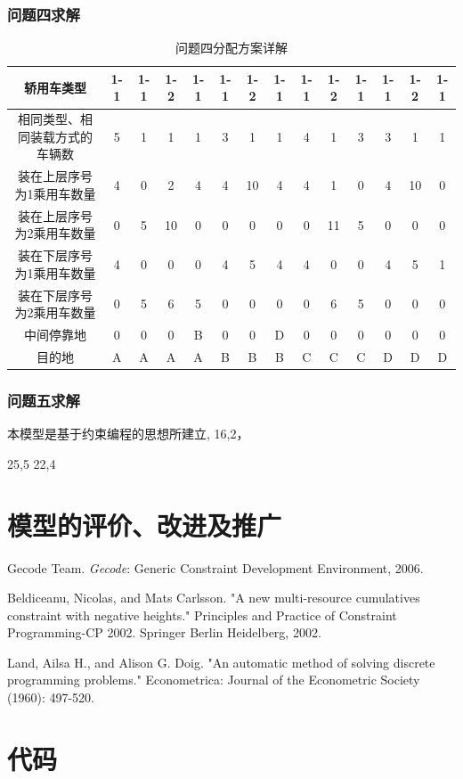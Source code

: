 \documentclass[UTF8]{ctexart}
\begin{document}
\subsubsection{问题四求解}
\begin{table}[h!]
\centering
\caption{问题四分配方案详解}\label{tab:answer4}
\begin{tabular}{|c|c|c|c|c|c|c|c|c|c|c|c|c|c|}
\hline
轿用车类型 & 1-1 & 1-1 & 1-2 & 1-1 & 1-1 & 1-2 & 1-1 & 1-1 & 1-2 & 1-1 & 1-1 & 1-2 & 1-1\\ \hline 
相同类型、相同装载方式的车辆数 & 5 & 1 & 1 & 1 & 3 & 1 & 1 & 4 & 1 & 3 & 3 & 1 & 1\\ \hline 
装在上层序号为1乘用车数量 & 4 & 0 & 2 & 4 & 4 & 10 & 4 & 4 & 1 & 0 & 4 & 10 & 0\\ \hline 
装在上层序号为2乘用车数量 & 0 & 5 & 10 & 0 & 0 & 0 & 0 & 0 & 11 & 5 & 0 & 0 & 0\\ \hline 
装在下层序号为1乘用车数量 & 4 & 0 & 0 & 0 & 4 & 5 & 4 & 4 & 0 & 0 & 4 & 5 & 1\\ \hline 
装在下层序号为2乘用车数量 & 0 & 5 & 6 & 5 & 0 & 0 & 0 & 0 & 6 & 5 & 0 & 0 & 0\\ \hline 
中间停靠地 & 0 & 0 & 0 & B & 0 & 0 & D & 0 & 0 & 0 & 0 & 0 & 0\\ \hline 
目的地 & A & A & A & A & B & B & B & C & C & C & D & D & D\\ \hline 
\end{tabular}
\end{table}


\subsubsection{问题五求解}
本模型是基于约束编程的思想所建立,
16,2，

25,5
22,4
\section{模型的评价、改进及推广}






\begin{thebibliography}{1}  %
 Gecode Team.  \textit{Gecode}: Generic Constraint
  Development Environment, 2006. 
  
Beldiceanu, Nicolas, and Mats Carlsson. "A new multi-resource cumulatives constraint with negative heights." Principles and Practice of Constraint Programming-CP 2002. Springer Berlin Heidelberg, 2002. 

 Land, Ailsa H., and Alison G. Doig. "An automatic method of solving discrete programming problems." Econometrica: Journal of the Econometric Society (1960): 497-520.


\end{thebibliography}

\appendix
\section{代码}
\end{document}

